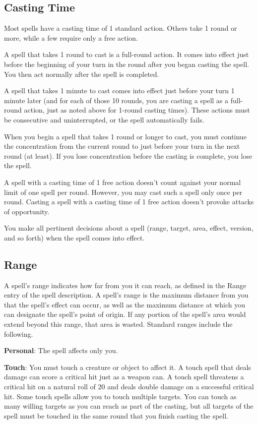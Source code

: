 \subsection{Casting Time}
Most spells have a casting time of 1 standard action. Others take 1 round or more, while a few require only a free action.

A spell that takes 1 round to cast is a full-round action. It comes into effect just before the beginning of your turn in the round after you began casting the spell. You then act normally after the spell is completed.

A spell that takes 1 minute to cast comes into effect just before your turn 1 minute later (and for each of those 10 rounds, you are casting a spell as a full-round action, just as noted above for 1-round casting times). These actions must be consecutive and uninterrupted, or the spell automatically fails.

When you begin a spell that takes 1 round or longer to cast, you must continue the concentration from the current round to just before your turn in the next round (at least). If you lose concentration before the casting is complete, you lose the spell.

A spell with a casting time of 1 free action doesn't count against your normal limit of one spell per round. However, you may cast such a spell only once per round. Casting a spell with a casting time of 1 free action doesn't provoke attacks of opportunity.

You make all pertinent decisions about a spell (range, target, area, effect, version, and so forth) when the spell comes into effect.

\subsection{Range}
A spell's range indicates how far from you it can reach, as defined in the Range entry of the spell description. A spell's range is the maximum distance from you that the spell's effect can occur, as well as the maximum distance at which you can designate the spell's point of origin. If any portion of the spell's area would extend beyond this range, that area is wasted. Standard ranges include the following.

\textbf{Personal}: The spell affects only you.

\textbf{Touch}: You must touch a creature or object to affect it. A touch spell that deals damage can score a critical hit just as a weapon can. A touch spell threatens a critical hit on a natural roll of 20 and deals double damage on a successful critical hit. Some touch spells allow you to touch multiple targets. You can touch as many willing targets as you can reach as part of the casting, but all targets of the spell must be touched in the same round that you finish casting the spell.

